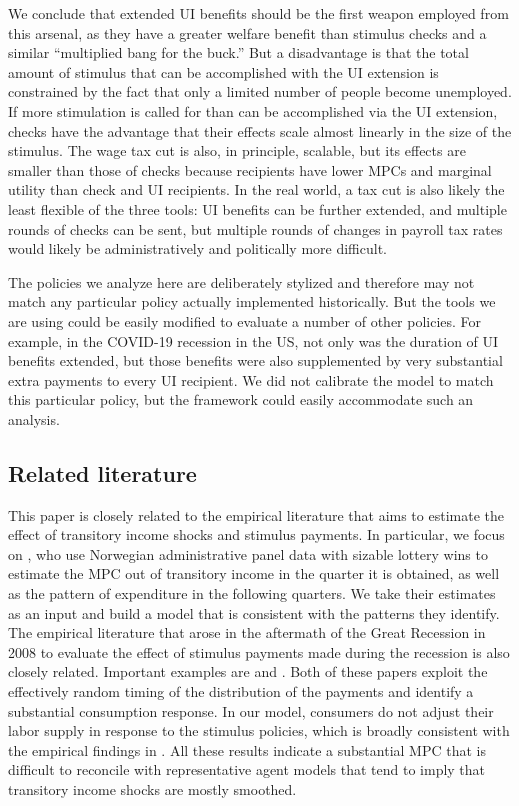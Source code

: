 \documentclass[\econtexRoot/HAFiscal]{subfiles}
\begin{document}
We conclude that extended UI benefits should be the first weapon employed from this arsenal, as they have a greater welfare benefit than stimulus checks and a similar ``multiplied bang for the buck.'' But a disadvantage is that the total amount of stimulus that can be accomplished with the UI extension is constrained by the fact that only a limited number of people become unemployed.  If more stimulation is called for than can be accomplished via the UI extension, checks have the advantage that their effects scale almost linearly in the size of the stimulus.  The wage tax cut is also, in principle, scalable, but its effects are smaller than those of checks because recipients have lower MPCs and marginal utility than check and UI recipients.  In the real world, a tax cut is also likely the least flexible of the three tools:  UI benefits can be further extended, and multiple rounds of checks can be sent, but multiple rounds of changes in payroll tax rates would likely be administratively and politically more difficult.

The policies we analyze here are deliberately stylized and therefore may not match any particular policy actually implemented historically.  But the tools we are using could be easily modified to evaluate a number of other policies.  For example, in the COVID-19 recession in the US, not only was the duration of UI benefits extended, but those benefits were also supplemented by very substantial extra payments to every UI recipient.  We did not calibrate the model to match this particular policy, but the framework could easily accommodate such an analysis.

\hypertarget{Related-Literature}{}\subsection{Related literature}
\notinsubfile{\label{sec:lit}}

This paper is closely related to the empirical literature that aims to estimate the effect of transitory income shocks and stimulus payments. In particular, we focus on \cite{fagereng_mpc_2021}, who use Norwegian administrative panel data with sizable lottery wins to estimate the MPC out of transitory income in the quarter it is obtained, as well as the pattern of expenditure in the following quarters. We take their estimates as an input and build a model that is consistent with the patterns they identify. The empirical literature that arose in the aftermath of the Great Recession in 2008 to evaluate the effect of stimulus payments made during the recession is also closely related. Important examples are \cite{parker2013consumer} and \cite{broda2014economic}. Both of these papers exploit the effectively random timing of the distribution of the payments and identify a substantial consumption response. In our model, consumers do not adjust their labor supply in response to the stimulus policies, which is broadly consistent with the empirical findings in \cite{ganong2022spending}. All these results indicate a substantial MPC that is difficult to reconcile with representative agent models that tend to imply that transitory income shocks are mostly smoothed. 
\end{document}

